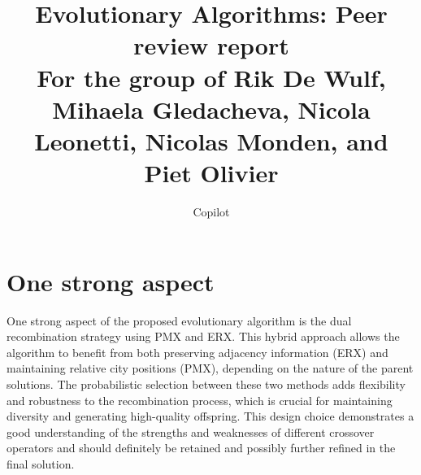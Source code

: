 \documentclass[a4paper,10pt]{article}
\title{\vspace{-2cm}Evolutionary Algorithms: Peer review report\\ {\large For the group of Rik De Wulf, Mihaela Gledacheva, Nicola Leonetti, Nicolas Monden, and Piet Olivier}}
\author{Copilot}
\newcommand{\thisyear}{\the\year}
\newcommand{\deadlinePeer}{November 17, \thisyear{} at 9:00 CET}
\newcommand{\ReplaceMe}[1]{{\color{blue}#1}}
\newcommand{\RemoveMe}[1]{{\color{purple}#1}}
\begin{document}
\selectfont{}

\maketitle

%
%
%
%

\section{One strong aspect}


One strong aspect of the proposed evolutionary algorithm is the dual recombination strategy using PMX and ERX. This hybrid approach allows the algorithm to benefit from both preserving adjacency information (ERX) and maintaining relative city positions (PMX), depending on the nature of the parent solutions. The probabilistic selection between these two methods adds flexibility and robustness to the recombination process, which is crucial for maintaining diversity and generating high-quality offspring. This design choice demonstrates a good understanding of the strengths and weaknesses of different crossover operators and should definitely be retained and possibly further refined in the final solution.
\end{document}
